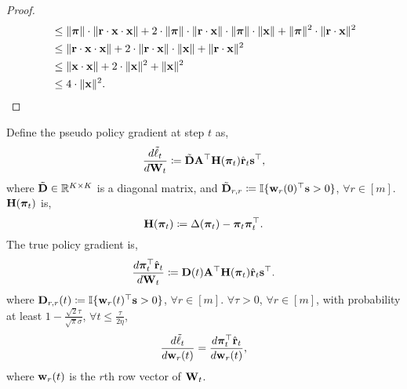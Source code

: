 \begin{proof}
\begin{equation*}
\begin{split}
    &\le \| {\boldsymbol{\pi}} \| \cdot \| {\mathbf{r}} \cdot {\mathbf{x}} \cdot {\mathbf{x}} \| + 2 \cdot \| {\boldsymbol{\pi}} \| \cdot \| {\mathbf{r}} \cdot {\mathbf{x}} \| \cdot \| {\boldsymbol{\pi}} \| \cdot \| {\mathbf{x}} \| + \| {\boldsymbol{\pi}} \|^2 \cdot \| {\mathbf{r}} \cdot {\mathbf{x}} \|^2 \\
    &\le \| {\mathbf{r}} \cdot {\mathbf{x}} \cdot {\mathbf{x}} \| + 2 \cdot \| {\mathbf{r}} \cdot {\mathbf{x}} \| \cdot \| {\mathbf{x}} \| + \| {\mathbf{r}} \cdot {\mathbf{x}} \|^2 \\
    &\le \| {\mathbf{x}} \cdot {\mathbf{x}} \| + 2 \cdot \| {\mathbf{x}} \|^2 + \| {\mathbf{x}} \|^2 \\
    &\le 4 \cdot \| {\mathbf{x}} \|^2. \qedhere
\end{split}
\end{equation*}
\end{proof}

\begin{lem}
\label{lem:gradient_coupling}
	Define the pseudo policy gradient at step $t$ as,
\begin{equation*}
\begin{split}
	\frac{d \tilde{\ell}_t}{d {\mathbf{W}}_t} \coloneqq \tilde{{\mathbf{D}}} {\mathbf{A}}^\top {\mathbf{H}}( {\boldsymbol{\pi}}_t ) \hat{{\mathbf{r}}}_t {\mathbf{s}}^\top,
\end{split}
\end{equation*}
where $\tilde{{\mathbf{D}}} \in {\mathbb{R}}^{K \times K}$ is a diagonal matrix, and  $\tilde{{\mathbf{D}}}_{r,r} \coloneqq {\mathbb{I}}\{ {\mathbf{w}}_r(0)^\top {\mathbf{s}} > 0 \}$, $\forall r \in [m]$. ${\mathbf{H}}( {\boldsymbol{\pi}}_t )$ is,
\begin{equation*}
    {\mathbf{H}}( {\boldsymbol{\pi}}_t ) \coloneqq \Delta( {\boldsymbol{\pi}}_t ) - {\boldsymbol{\pi}}_t {\boldsymbol{\pi}}_t^\top.
\end{equation*}
The true policy gradient is,
\begin{equation*}
\begin{split}
    \frac{d {\boldsymbol{\pi}}_t^\top \hat{{\mathbf{r}}}_t}{d {\mathbf{W}}_t} \coloneqq  {\mathbf{D}}(t) {\mathbf{A}}^\top {\mathbf{H}}( {\boldsymbol{\pi}}_t ) \hat{{\mathbf{r}}}_t {\mathbf{s}}^\top.
\end{split}
\end{equation*}
where ${\mathbf{D}}_{r,r}(t) \coloneqq {\mathbb{I}}\{ {\mathbf{w}}_r(t)^\top {\mathbf{s}} > 0 \}$, $\forall r \in [m]$. $\forall \tau > 0$, $\forall r \in [m]$, with probability at least $1 - \frac{\sqrt{2}\tau}{\sqrt{\pi}\sigma}$, $\forall t \le \frac{\tau}{ 2 \eta }$,
\begin{equation*}
	\frac{d\tilde{\ell}_t}{d {\mathbf{w}}_r(t)} = \frac{d {\boldsymbol{\pi}}_t^\top \hat{{\mathbf{r}}}_t}{d {\mathbf{w}}_r(t)},
\end{equation*}
where ${\mathbf{w}}_r(t)$ is the $r$th row vector of ${\mathbf{W}}_t$.
\end{lem}
